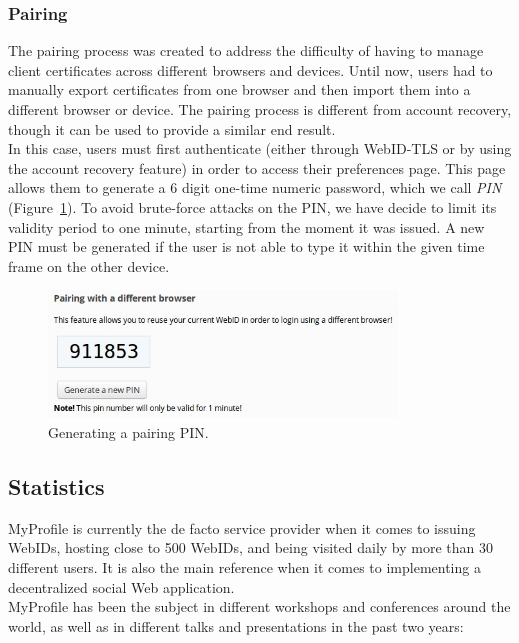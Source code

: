 \subsubsection{Pairing}
The pairing process was created to address the difficulty of having to manage client certificates across different browsers and devices. Until now, users had to manually export certificates from one browser and then import them into a different browser or device. The pairing process is different from account recovery, though it can be used to provide a similar end result.\\

In this case, users must first authenticate (either through WebID-TLS or by using the account recovery feature) in order to access their preferences page. This page allows them to generate a 6 digit one-time numeric password, which we call \textit{PIN} (Figure~\ref{fig:pairing_pin}). To avoid brute-force attacks on the PIN, we have decide to limit its validity period to one minute, starting from the moment it was issued. A new PIN must be generated if the user is not able to type it within the given time frame on the other device.\\

\begin{figure}[htbp]
  \begin{center}
    \includegraphics[width=350px]{img/screens/pin_gen.jpg}
        \caption{Generating a pairing PIN.}
        \label{fig:pairing_pin}
  \end{center}
\end{figure}

\subsection{Statistics}
MyProfile is currently the de facto service provider when it comes to issuing WebIDs, hosting close to 500 WebIDs, and being visited daily by more than 30 different users. It is also the main reference when it comes to implementing a decentralized social Web application.\\

MyProfile has been the subject in different workshops and conferences around the world, as well as in different talks and presentations in the past two years:

